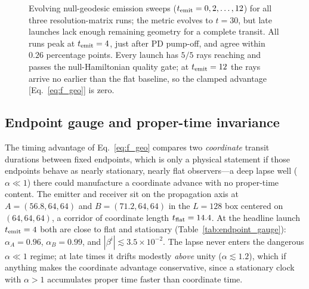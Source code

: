 \documentclass[twocolumn,floatfix,aps,prd,nofootinbib]{revtex4-2}
\begin{document}
\begin{figure}[tbp]
\centering
{}
\caption{Evolving null-geodesic emission sweeps
($t_{\rm emit}=0,2,\ldots,12$) for all three resolution-matrix runs; the
metric evolves to $t=30$, but late launches lack enough remaining geometry
for a complete transit. All runs peak at $t_{\rm emit}=4$, just after PD
pump-off, and agree within $0.26$ percentage points. Every launch has
$5/5$ rays reaching and passes the null-Hamiltonian quality gate; at
$t_{\rm emit}=12$ the rays arrive no earlier than the flat baseline, so the
clamped advantage [Eq.~\eqref{eq:f_geo}] is zero.}
\label{fig:fgeo_validation}
\end{figure}

\subsection{Endpoint gauge and proper-time invariance}
\label{sec:endpoint_gauge}

The timing advantage of Eq.~\eqref{eq:f_geo} compares two \emph{coordinate}
transit durations between fixed endpoints, which is only a physical statement
if those endpoints behave as nearly stationary, nearly flat observers---a deep
lapse well ($\alpha\ll1$) there could manufacture a coordinate advance with no
proper-time content. The emitter and receiver sit on the propagation axis at
$A=(56.8,64,64)$ and $B=(71.2,64,64)$ in the $L=128$ box centered on
$(64,64,64)$, a corridor of coordinate length $t_{\rm flat}=14.4$. At the
headline launch $t_{\rm emit}=4$ both are close to flat and stationary
(Table~\ref{tab:endpoint_gauge}): $\alpha_A=0.96$, $\alpha_B=0.99$, and
$|\beta^i|\lesssim3.5\times10^{-2}$. The lapse never enters the dangerous
$\alpha\ll1$ regime; at late times it drifts modestly \emph{above} unity
($\alpha\lesssim1.2$), which if anything makes the coordinate advantage
conservative, since a stationary clock with $\alpha>1$ accumulates proper time
faster than coordinate time.
\end{document}
